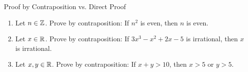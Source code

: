 \begin{exercise}{Proof by Contraposition vs. Direct Proof}
\begin{enumerate}[leftmargin=1.5em,itemsep=2pt]
  \item Let $n \in \mathbb{Z}$. Prove by contraposition: If $n^2$ is even, then $n$ is even.
  \item Let $x \in \mathbb{R}$. Prove by contraposition: If $3x^3 - x^2 + 2x - 5$ is irrational, then $x$ is irrational.
  \item Let $x, y \in \mathbb{R}$. Prove by contraposition: If $x + y > 10$, then $x > 5$ or $y > 5$.
\end{enumerate}
\end{exercise}

\begin{tabletworkspace}[5.0cm]
\end{tabletworkspace}

